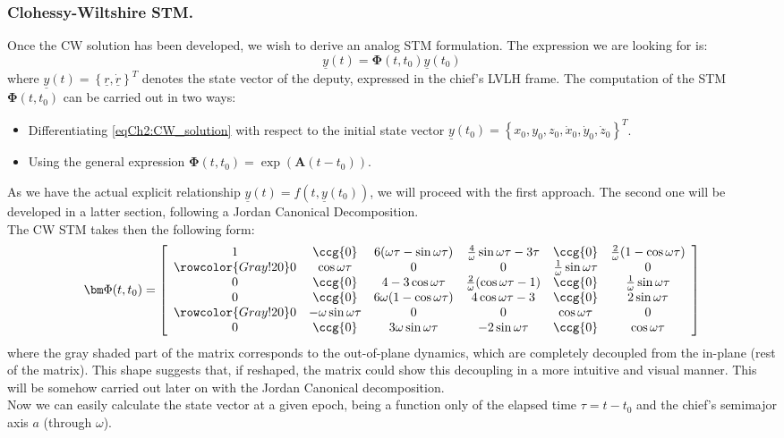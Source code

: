 		\subsubsection{Clohessy-Wiltshire STM.}
		\indent Once the CW solution has been developed, we wish to derive an analog STM formulation. The expression we are looking for is:
		\[
		\underline{y}(t) = \bm \Phi (t, t_0) \underline{y}(t_0)
		\]
		\noindent where $\underline{y}(t) = \left\{ \underline{r}, \underline{\dot{r}}\right\}^T$ denotes the state vector of the deputy, expressed in the chief's LVLH frame. The computation of the STM $\bm \Phi (t, t_0)$ can be carried out in two ways:
		\begin{itemize}
		\item[\GMVred{A.}] Differentiating \eqref{eqCh2:CW_solution} with respect to the initial state vector $\underline{y}(t_0) = \left\{ x_0, y_0, z_0, \dot{x}_0, \dot{y}_0, \dot{z}_0\right\}^T$.
		\item[\GMVred{B.}] Using the general expression $\bm \Phi (t, t_0) = \exp\left( \bm A (t - t_0)\right) $.
		\end{itemize}
		\indent As we have the actual explicit relationship $\underline{y}(t) = f (t, \underline{y}(t_0))$, we will proceed with the first approach. The second one will be developed in a latter section, following a Jordan Canonical Decomposition.\\
		\indent The CW STM takes then the following form:
		\begin{equation}
		\bm \Phi (t, t_0) = \left[
		\begin{array}{cccccc}
		1	& \ccg{0}					& 6(\omega\tau - \sin\omega\tau)	& \frac{4}{\omega} \sin\omega\tau - 3\tau	& \ccg{0}						& \frac{2}{\omega} (1 - \cos\omega\tau) \\
		\rowcolor{Gray!20}
		0	& \cos\omega\tau			& 0									& 0 										&\frac{1}{\omega}\sin\omega\tau & 0 \\
		0	& \ccg{0}					& 4 - 3 \cos\omega\tau				& \frac{2}{\omega} (\cos\omega\tau - 1)		& \ccg{0}						& \frac{1}{\omega} \sin\omega\tau\\
		0	& \ccg{0}					& 6\omega (1 - \cos\omega\tau)		& 4\cos\omega\tau - 3						& \ccg{0}						& 2\sin\omega\tau	\\
		\rowcolor{Gray!20}
		0	& -\omega \sin\omega\tau	& 0									& 0											& \cos\omega\tau				& 0\\
		0	& \ccg{0}					& 3\omega\sin\omega\tau 			& -2 \sin\omega\tau							& \ccg{0}						& \cos\omega\tau
		\end{array}\right]
		\label{eqCh2:CW_STM}
		\end{equation}
		\noindent where the gray shaded part of the matrix corresponds to the out-of-plane dynamics, which are completely decoupled from the in-plane (rest of the matrix). This shape suggests that, if reshaped, the matrix could show this decoupling in a more intuitive and visual manner. This will be somehow carried out later on with the Jordan Canonical decomposition.\\
		\indent Now we can easily calculate the state vector at a given epoch, being a function only of the elapsed time $\tau = t -t_0$ and the chief's semimajor axis $a$ (through $\omega$).
